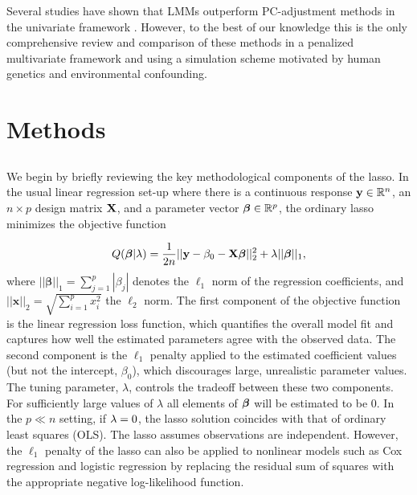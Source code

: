 Several studies have shown that LMMs outperform PC-adjustment methods in the univariate framework \citep{wang2013analytical, kang2010variance, zhao2007arabidopsis}. However, to the best of our knowledge this is the only comprehensive review and comparison of these methods in a penalized multivariate framework and using a simulation scheme motivated by human genetics and environmental confounding.\\

\section{Methods} \label{sec:methods}
\subsection{}
We begin by briefly reviewing the key methodological components of the lasso. In the usual linear regression set-up where there is a continuous response $\mathbf{y} \in \mathbb{R}^n$, an $n \times p$ design matrix $\mathbf{X}$, and a parameter vector $\boldsymbol{\beta}{} \in \mathbb{R}^p$, the ordinary lasso minimizes the objective function

\begin{equation}
    Q(\boldsymbol{\beta}{} | \lambda) = \frac{1}{2n}|| \mathbf{y} -  \beta_0 - \mathbf{X} \boldsymbol{\beta}{} ||_2^2 + \lambda ||\boldsymbol{\beta}{}||_1,
\end{equation}
where $|| \boldsymbol{\beta} ||_1 = \sum_{j=1}^p |\beta_j|$ denotes the $\ell_1$ norm of the regression coefficients, and $||\mathbf{x}||_2 = \sqrt{\sum_{i=1}^p x_i^2}$ the $\ell_2$ norm. The first component of the objective function is the linear regression loss function, which quantifies the overall model fit and captures how well the estimated parameters agree with the observed data. The second component is the $\ell_1$ penalty applied to the estimated coefficient values (but not the intercept, $\beta_0$), which discourages large, unrealistic parameter values. The tuning parameter, $\lambda$, controls the tradeoff between these two components. For sufficiently large values of $\lambda$ all elements of $\boldsymbol{\beta}{}$ will be estimated to be 0. In the $p \ll n$ setting, if $\lambda = 0$, the lasso solution coincides with that of ordinary least squares (OLS). The lasso assumes observations are independent. However, the $\ell_1$ penalty of the lasso can also be applied to nonlinear models such as Cox regression \citep{tibshirani1997lasso} and logistic regression \citep{shevade2003simple} by replacing the residual sum of squares with the appropriate negative log-likelihood function.


